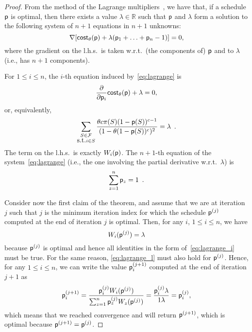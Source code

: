 \begin{proof}
	From the method of the Lagrange multipliers~\citep[Sect.~5.1]{BoydV04}, we
	have that, if a schedule $\mathsf{p}$ is optimal, then there exists a value
	$\lambda\in\mathbb{R}$ such that $\mathsf{p}$ and $\lambda$ form a solution to
	the following system of $n+1$ equations in $n+1$ unknowns:
	\begin{equation}\label{eq:lagrange}
		\nabla [\mathsf{cost}_\theta(\mathsf{p}) + \lambda (\mathsf{p}_1+\ldots+\mathsf{p}_n-1)] = 0,
	\end{equation}
	where the gradient on the l.h.s.~is taken w.r.t.~(the components of)
	$\mathsf{p}$ and to $\lambda$ (i.e., has $n+1$ components).

	For $1\le i\le n$, the $i$-th equation induced by~\eqref{eq:lagrange} is
	\[
		\frac{\partial}{\partial \mathsf{p}_i} \mathsf{cost}_\theta(\mathsf{p}) + \lambda = 0,
	\]
	or, equivalently,
	\begin{equation}\label{eq:lagrange_i}
		\sum_{\substack{S\in\mathcal{F}\\\mbox{s.t.} i\in S}} \frac{\theta c
			\pi(S) (1-\mathsf{p}(S))^{c-1}}{(1-\theta(1-\mathsf{p}(S))^c)^2} =
			\lambda\enspace.
	\end{equation}
	The term on the l.h.s.~is exactly $W_i(\mathsf{p})$.
	The $n+1$-th equation of the system~\eqref{eq:lagrange} (i.e., the one
	involving the partial derivative w.r.t.~$\lambda$) is
	\begin{equation}\label{eq:lagrange_l}
		\sum_{z=1}^n \mathsf{p}_z = 1\enspace.
	\end{equation}

	Consider now the first claim of the theorem, and assume that we
	are at iteration $j$ such that $j$ is the minimum iteration index for which
	the schedule $\mathsf{p}^{(j)}$ computed at the end of iteration $j$ is optimal.
	Then, for any $i$, $1\le i\le n$, we have
	\[
		W_i(\mathsf{p}^{(j)})=\lambda
	\]
	because $\mathsf{p}^{(j)}$ is optimal and hence all identities in the form
	of~\eqref{eq:lagrange_i} must be true. For the same reason,
	\eqref{eq:lagrange_l} must also hold for $\mathsf{p}^{(j)}$.
	Hence, for any $1\le i\le n$, we can write the value $\mathsf{p}^{(j+1)}_i$
	computed at the end of iteration $j+1$ as
	\[
		\mathsf{p}^{(j+1)}_i = \frac{\mathsf{p}^{(j)}_i W_i(\mathsf{p}^{(j)})}{\sum_{z=1}^n
		\mathsf{p}^{(j)}_z W_z(\mathsf{p}^{(j)})}=
		\frac{\mathsf{p}^{(j)}_i\lambda}{1\lambda}=\mathsf{p}^{(j)}_i,
	\]
	which means that we reached convergence and \algoname will return
	$\mathsf{p}^{(j+1)}$, which is optimal because $\mathsf{p}^{(j+1)}=\mathsf{p}^{(j)}$.


\end{proof}
